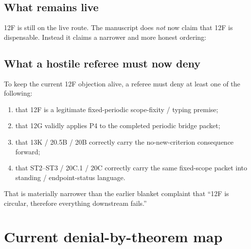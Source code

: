 \documentclass[11pt,letterpaper]{article}
\begin{document}
\subsection{What remains live}
12F is still on the live route. The manuscript does \emph{not} now claim that 12F is dispensable. Instead it claims a narrower and more honest ordering:
\begin{center}
\end{center}

\subsection{What a hostile referee must now deny}
To keep the current 12F objection alive, a referee must deny at least one of the following:
\begin{enumerate}[label=(\alph*),leftmargin=2.2em]
\item that 12F is a legitimate fixed-periodic scope-fixity / typing premise;
\item that 12G validly applies P4 to the completed periodic bridge packet;
\item that 13K / 20.5B / 20B correctly carry the no-new-criterion consequence forward;
\item that ST2--ST3 / 20C.1 / 20C correctly carry the same fixed-scope packet into standing / endpoint-status language.
\end{enumerate}

That is materially narrower than the earlier blanket complaint that ``12F is circular, therefore everything downstream fails.''

\section{Current denial-by-theorem map}
\end{document}

